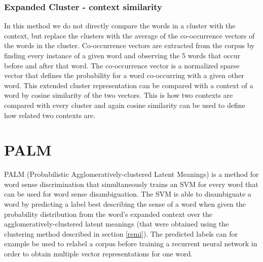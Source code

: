 \documentclass[11pt]{article}
\begin{document}
\subsubsection{Expanded Cluster - context similarity}
\label{remi2}
In this method we do not directly compare the words in a cluster with the context, but replace the clusters with the average of the co-occurrence vectors of the words in the cluster. Co-occurrence vectors are extracted from the corpus by finding every instance of a given word and observing the 5 words that occur before and after that word. The co-occurrence vector is a normalized sparse vector that defines the probability for a word co-occurring with a given other word. This extended cluster representation can be compared with a context of a word by cosine similarity of the two vectors. This is how two contexts are compared with every cluster and again cosine similarity can be used to define how related two contexts are.

\section{PALM}
PALM (Probabilistic Agglomeratively-clustered Latent Meanings) is a method for word sense discrimination that simultaneously trains an SVM for every word that can be used for word sense disambiguation. The SVM is able to disambiguate a word by predicting a label best describing the sense of a word when given the probability distribution from the word's expanded context over the agglomeratively-clustered latent meanings (that were obtained using the clustering method described in section \ref{remi}). The predicted labels can for example be used to relabel a corpus before training a recurrent neural network in order to obtain multiple vector representations for one word. 
\end{document}
